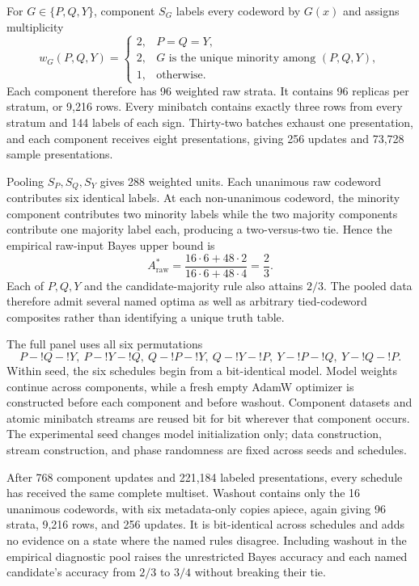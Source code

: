 \documentclass[11pt,a4paper]{article}
\begin{document}
For $G\in\{P,Q,Y\}$, component $S_G$ labels every codeword by $G(x)$ and assigns multiplicity
\[
w_G(P,Q,Y)=
\begin{cases}
2,&P=Q=Y,\\
2,&G\text{ is the unique minority among }(P,Q,Y),\\
1,&\text{otherwise}.
\end{cases}
\]
Each component therefore has 96 weighted raw strata. It contains 96 replicas per stratum, or 9,216 rows. Every minibatch contains exactly three rows from every stratum and 144 labels of each sign. Thirty-two batches exhaust one presentation, and each component receives eight presentations, giving 256 updates and 73,728 sample presentations.

Pooling $S_P,S_Q,S_Y$ gives 288 weighted units. Each unanimous raw codeword contributes six identical labels. At each non-unanimous codeword, the minority component contributes two minority labels while the two majority components contribute one majority label each, producing a two-versus-two tie. Hence the empirical raw-input Bayes upper bound is
\[
A^*_{\mathrm{raw}}
=\frac{16\cdot6+48\cdot2}{16\cdot6+48\cdot4}
=\frac23.
\]
Each of $P,Q,Y$ and the candidate-majority rule also attains $2/3$. The pooled data therefore admit several named optima as well as arbitrary tied-codeword composites rather than identifying a unique truth table.

The full panel uses all six permutations
\[
P\!-!Q\!-!Y,\ P\!-!Y\!-!Q,\ Q\!-!P\!-!Y,\
Q\!-!Y\!-!P,\ Y\!-!P\!-!Q,\ Y\!-!Q\!-!P.
\]
Within seed, the six schedules begin from a bit-identical model. Model weights continue across components, while a fresh empty AdamW optimizer is constructed before each component and before washout. Component datasets and atomic minibatch streams are reused bit for bit wherever that component occurs. The experimental seed changes model initialization only; data construction, stream construction, and phase randomness are fixed across seeds and schedules.

After 768 component updates and 221,184 labeled presentations, every schedule has received the same complete multiset. Washout contains only the 16 unanimous codewords, with six metadata-only copies apiece, again giving 96 strata, 9,216 rows, and 256 updates. It is bit-identical across schedules and adds no evidence on a state where the named rules disagree. Including washout in the empirical diagnostic pool raises the unrestricted Bayes accuracy and each named candidate's accuracy from $2/3$ to $3/4$ without breaking their tie.
\end{document}
